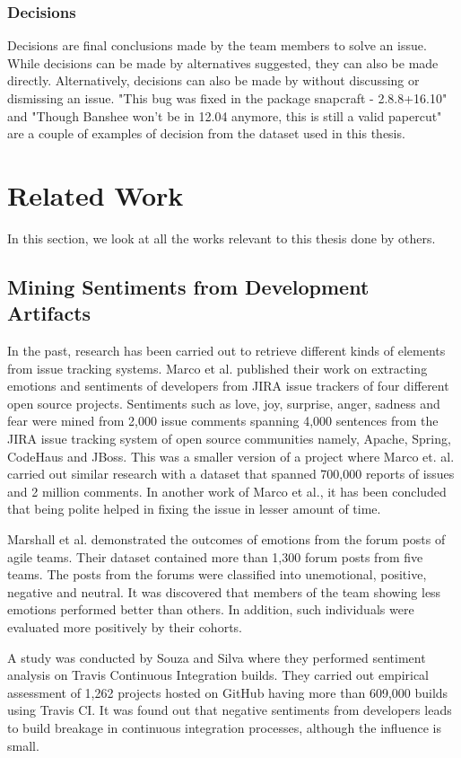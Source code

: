 \documentclass[a4paper,12pt,twoside]{report}
\begin{document}
\subsubsection{Decisions}
Decisions are final conclusions made by the team members to solve an issue. While decisions can be made by alternatives suggested, they can also be made directly. Alternatively, decisions can also be made by without discussing or dismissing an issue. "This bug was fixed in the package snapcraft - 2.8.8+16.10" and "Though Banshee won't be in 12.04 anymore, this is still a valid papercut" are a couple of examples of decision from the dataset used in this thesis.


\section{Related Work}

In this section, we look at all the works relevant to this thesis done by others. 

\subsection{Mining Sentiments from Development Artifacts}
In the past, research has been carried out to retrieve different kinds of elements from issue tracking systems. Marco et al. published their work on extracting emotions and sentiments of developers from JIRA issue trackers of four different open source projects.  Sentiments such as love, joy, surprise, anger, sadness and fear were mined from 2,000 issue comments spanning 4,000 sentences from the JIRA issue tracking system of open source communities namely, Apache, Spring, CodeHaus and JBoss. This was a smaller version of a project where Marco et. al. carried out similar research with a dataset that spanned 700,000 reports of issues and 2 million comments. In another work of Marco et al., it has been concluded that being polite helped in fixing the issue in lesser amount of time. 

Marshall et al. demonstrated the outcomes of emotions from the forum posts of agile teams. Their dataset contained more than 1,300 forum posts from five teams. The posts from the forums were classified into unemotional, positive, negative and neutral. It was discovered that members of the team showing less emotions performed better than others. In addition, such individuals were evaluated more positively by their cohorts. 

A study was conducted by Souza and Silva where they performed sentiment analysis on Travis Continuous Integration builds. They carried out empirical assessment of 1,262 projects hosted on GitHub having more than 609,000 builds using Travis CI. It was found out that negative sentiments from developers leads to build breakage in continuous integration processes, although the influence is small. 
\end{document}
